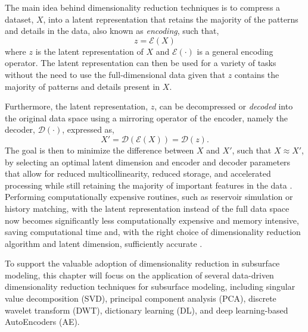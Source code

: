 \documentclass[a4paper,fleqn,12pt]{article}
\begin{document}
The main idea behind dimensionality reduction techniques is to compress a dataset, $X$, into a latent representation that retains the majority of the patterns and details in the data, also known as \emph{encoding}, such that,
\begin{equation}
    z=\mathcal{E}(X)
\end{equation}
where $z$ is the latent representation of $X$ and $\mathcal{E}(\cdot)$ is a general encoding operator. The latent representation can then be used for a variety of tasks without the need to use the full-dimensional data given that $z$ contains the majority of patterns and details present in $X$.

Furthermore, the latent representation, $z$, can be decompressed or \emph{decoded} into the original data space using a mirroring operator of the encoder, namely the decoder, $\mathcal{D}(\cdot)$, expressed as,
\begin{equation}
    X'=\mathcal{D}(\mathcal{E}(X))=\mathcal{D}(z).
\end{equation}
The goal is then to minimize the difference between $X$ and $X'$, such that $X\approx X'$, by selecting an optimal latent dimension and encoder and decoder parameters that allow for reduced multicollinearity, reduced storage, and accelerated processing while still retaining the majority of important features in the data \cite{mabadeje2024evaluating, mabadeje2024rigid}. Performing computationally expensive routines, such as reservoir simulation or history matching, with the latent representation instead of the full data space now becomes significantly less computationally expensive and memory intensive, saving computational time and, with the right choice of dimensionality reduction algorithm and latent dimension, sufficiently accurate \cite{morales2025optimal, chen2024assimilation}.

To support the valuable adoption of dimensionality reduction in subsurface modeling, this chapter will focus on the application of several data-driven dimensionality reduction techniques for subsurface modeling, including singular value decomposition (SVD), principal component analysis (PCA), discrete wavelet transform (DWT), dictionary learning (DL), and deep learning-based AutoEncoders (AE). 
\end{document}
